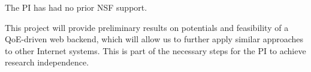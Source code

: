
 The PI has had no prior NSF support.

This project will provide preliminary results on potentials and feasibility of a QoE-driven web backend, which will allow us to further apply similar approaches to other Internet systems. This is part of the necessary steps for the PI to achieve research independence.











